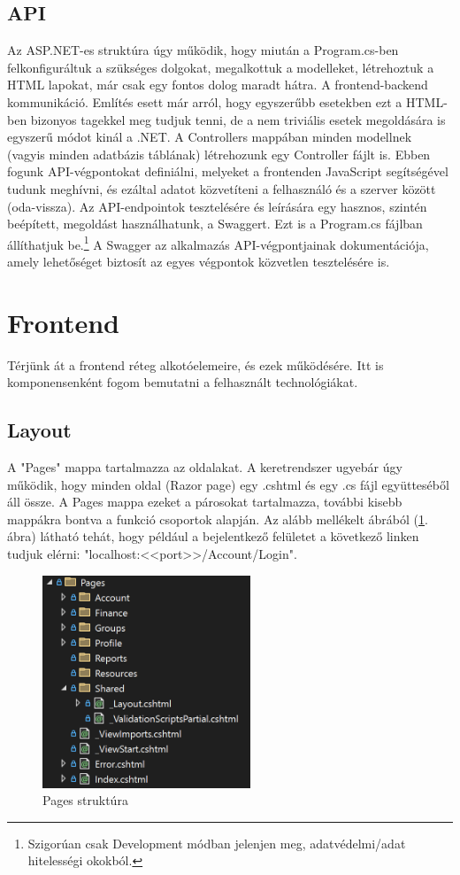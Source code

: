 \subsection{API}
Az ASP.NET-es struktúra úgy működik, hogy miután a 
Program.cs-ben felkonfiguráltuk a szükséges dolgokat, megalkottuk a modelleket, létrehoztuk a HTML lapokat, már csak
egy fontos dolog maradt hátra. A frontend-backend kommunikáció.
Említés esett már arról, hogy egyszerűbb esetekben ezt a HTML-ben
bizonyos tagekkel meg tudjuk tenni, de a nem triviális esetek
megoldására is egyszerű módot kinál a .NET. A Controllers
mappában minden modellnek (vagyis minden adatbázis táblának)
létrehozunk egy Controller fájlt is. Ebben fogunk API-végpontokat
definiálni, melyeket a frontenden JavaScript segítségével tudunk
meghívni, és ezáltal adatot közvetíteni a felhasználó és a szerver
között (oda-vissza). Az API-endpointok tesztelésére és leírására
egy hasznos, szintén beépített, megoldást használhatunk, a Swaggert.
Ezt is a Program.cs fájlban állíthatjuk be.\footnote{Szigorúan csak 
Development módban jelenjen meg, adatvédelmi/adat hitelességi okokból.} A Swagger az alkalmazás API-végpontjainak dokumentációja, amely lehetőséget biztosít az egyes végpontok közvetlen tesztelésére is.
\section{Frontend}
Térjünk át a frontend réteg alkotóelemeire, és ezek működésére. Itt is komponensenként fogom bemutatni a felhasznált technológiákat.

\subsection{Layout}
A "Pages" mappa tartalmazza az oldalakat. A keretrendszer ugyebár úgy működik, hogy minden oldal (Razor page) egy .cshtml és egy .cs
fájl együtteséből áll össze. A Pages mappa ezeket a párosokat tartalmazza, további kisebb mappákra bontva a funkció csoportok alapján. Az alább mellékelt ábrából (\ref{fig:pages-structure}. ábra) látható tehát, hogy például a bejelentkező felületet a következő linken tudjuk elérni: "localhost:<<port>>/Account/Login".

\begin{figure}[H]
	\centering
	\includegraphics[height=240px]{img/solution-explorer-pages-screenshot}
	\caption{Pages struktúra}
	\label{fig:pages-structure}
\end{figure}

